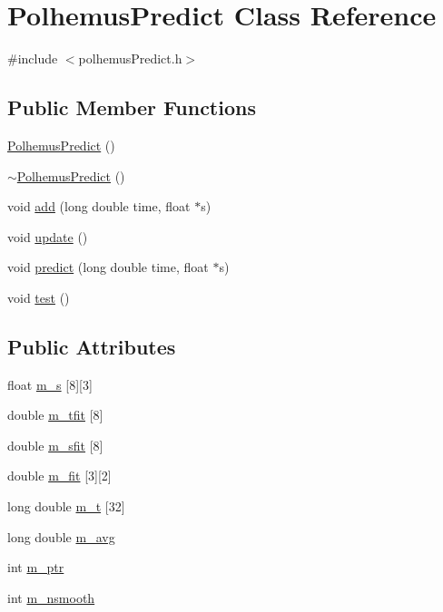 \hypertarget{classPolhemusPredict}{\section{Polhemus\-Predict Class Reference}
\label{classPolhemusPredict}
}


{\ttfamily \#include $<$polhemus\-Predict.\-h$>$}

\subsection*{Public Member Functions}
\begin{DoxyCompactItemize}
\item 
\hyperlink{classPolhemusPredict_a8859b6c40145febc1be8d3de2829db06}{Polhemus\-Predict} ()
\item 
\hyperlink{classPolhemusPredict_aed26806110fb424d1f5d2564ca8ee964}{$\sim$\-Polhemus\-Predict} ()
\item 
void \hyperlink{classPolhemusPredict_ac43d041255be0ff7310f946d47854b0d}{add} (long double time, float $\ast$s)
\item 
void \hyperlink{classPolhemusPredict_a22dbd25545df6dfb9f807762039c1de6}{update} ()
\item 
void \hyperlink{classPolhemusPredict_a644a69b7ee5556fd4541aac376c35cff}{predict} (long double time, float $\ast$s)
\item 
void \hyperlink{classPolhemusPredict_ac627f654bace0eaa639fbe81a2f26fa0}{test} ()
\end{DoxyCompactItemize}
\subsection*{Public Attributes}
\begin{DoxyCompactItemize}
\item 
float \hyperlink{classPolhemusPredict_a600f732b56f4b593f2cad5adfa0f73e0}{m\-\_\-s} \mbox{[}8\mbox{]}\mbox{[}3\mbox{]}
\item 
double \hyperlink{classPolhemusPredict_ab5b8aa990488309d6b5920c8f244e375}{m\-\_\-tfit} \mbox{[}8\mbox{]}
\item 
double \hyperlink{classPolhemusPredict_a73d63a68123ee20f3ae3f8fe578c080c}{m\-\_\-sfit} \mbox{[}8\mbox{]}
\item 
double \hyperlink{classPolhemusPredict_a1cb3c0e40b46146a167f6c0a070f6b56}{m\-\_\-fit} \mbox{[}3\mbox{]}\mbox{[}2\mbox{]}
\item 
long double \hyperlink{classPolhemusPredict_a902d24baccdcc54ce03c6da3a0cc9e53}{m\-\_\-t} \mbox{[}32\mbox{]}
\item 
long double \hyperlink{classPolhemusPredict_af81be0607c1b754fcad71269d5b75f70}{m\-\_\-avg}
\item 
int \hyperlink{classPolhemusPredict_abd929d55940ab156635153b79d4dcbc5}{m\-\_\-ptr}
\item 
int \hyperlink{classPolhemusPredict_aee6eb34dd5586c292d69c72b3ef35ded}{m\-\_\-nsmooth}
\end{DoxyCompactItemize}


